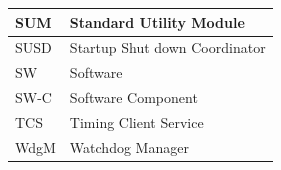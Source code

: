 \begin{longtable}{|l|l|}
\begin{minipage}{0.31\linewidth}\raggedright\vspace{.75ex}SUM\vspace{.75ex}\end{minipage} & \begin{minipage}{0.63\linewidth}\raggedright\vspace{.75ex}Standard Utility Module\vspace{.75ex}\end{minipage}\\\hline
\begin{minipage}{0.31\linewidth}\raggedright\vspace{.75ex}SUSD\vspace{.75ex}\end{minipage} & \begin{minipage}{0.63\linewidth}\raggedright\vspace{.75ex}Startup Shut down Coordinator\vspace{.75ex}\end{minipage}\\\hline
\begin{minipage}{0.31\linewidth}\raggedright\vspace{.75ex}SW\vspace{.75ex}\end{minipage} & \begin{minipage}{0.63\linewidth}\raggedright\vspace{.75ex}Software\vspace{.75ex}\end{minipage}\\\hline
\begin{minipage}{0.31\linewidth}\raggedright\vspace{.75ex}SW-C\vspace{.75ex}\end{minipage} & \begin{minipage}{0.63\linewidth}\raggedright\vspace{.75ex}Software Component\vspace{.75ex}\end{minipage}\\\hline
\begin{minipage}{0.31\linewidth}\raggedright\vspace{.75ex}TCS\vspace{.75ex}\end{minipage} & \begin{minipage}{0.63\linewidth}\raggedright\vspace{.75ex}Timing Client Service\vspace{.75ex}\end{minipage}\\\hline
\begin{minipage}{0.31\linewidth}\raggedright\vspace{.75ex}WdgM\vspace{.75ex}\end{minipage} & \begin{minipage}{0.63\linewidth}\raggedright\vspace{.75ex}Watchdog Manager\vspace{.75ex}\end{minipage}\\\hline
\end{longtable}
